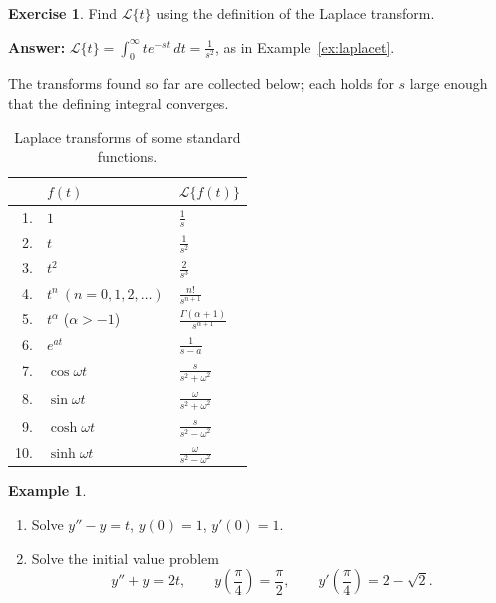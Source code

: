 \documentclass[11pt,a4paper]{article}
\theoremstyle{definition}
\newtheorem{exa}[thm]{Example}
\newtheorem{exe}[thm]{Exercise}
\begin{document}
\begin{exe}
\label{exe:lapt}
Find $\mathcal{L}\{t\}$ using the definition of the Laplace transform.

\textbf{Answer:} $\mathcal{L}\{t\} = \int^{\infty}_0t e^{-st}\,dt =
\frac{1}{s^2}$, as in Example~\ref{ex:laplacet}.
\end{exe}

The transforms found so far are collected below; each holds for $s$ large enough
that the defining integral converges.

\begin{table}[H]
\centering
\begin{tabular}{rll}
\hline
 & $f(t)$ & $\mathcal{L}\{f(t)\}$\\
\hline
1. & $1$ & $\frac{1}{s}$\\[1ex]
2. & $t$ & $\frac{1}{s^2}$\\[1ex]
3. & $t^2$ & $\frac{2}{s^3}$\\[1ex]
4. & $t^n\ (n =0,1,2,\dots )$ & $\frac{n!}{s^{n+1}}$\\[1ex]
5. & $t^{\alpha}$ ($\alpha>-1$) & $\frac{\Gamma (\alpha + 1)}{s^{\alpha + 1}}$\\[1ex]
6. & $e^{at}$ & $\frac{1}{s-a}$\\[1ex]
7. & $\cos \omega t$ & $\frac{s}{s^2 + \omega^2}$\\[1ex]
8. & $\sin \omega t$ & $\frac{\omega}{s^2 +\omega^2}$\\[1ex]
9. & $\cosh \omega t$ & $\frac{s}{s^2 - \omega^2}$\\[1ex]
10. & $\sinh \omega t$ & $\frac{\omega}{s^2 - \omega^2}$\\
\hline
\end{tabular}
\caption{Laplace transforms of some standard functions.}
\label{tab:laplace}
\end{table}

\begin{exa}
\label{ex:lapivp}
\begin{enumerate}
\item Solve $y'' - y = t$, $y(0) = 1$, $y'(0) = 1$.
\item Solve the initial value problem
\[y''+ y = 2t,\qquad y\left(\frac{\pi}{4}\right)=\frac{\pi}{2},\qquad
y'\left(\frac{\pi}{4}\right) = 2-\sqrt{2} .\]
\end{enumerate}
\end{exa}
\end{document}
